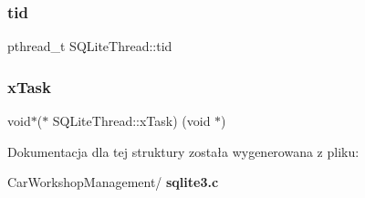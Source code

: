 \subsubsection{tid}
{\footnotesize\ttfamily pthread\+\_\+t S\+Q\+Lite\+Thread\+::tid}

\mbox{\label{struct_s_q_lite_thread_aadc8f1c225e769d42d981ae2e701d018}} 
\subsubsection{xTask}
{\footnotesize\ttfamily void$\ast$($\ast$ S\+Q\+Lite\+Thread\+::x\+Task) (void $\ast$)}



Dokumentacja dla tej struktury została wygenerowana z pliku\+:\begin{DoxyCompactItemize}
\item 
Car\+Workshop\+Management/\textbf{ sqlite3.\+c}\end{DoxyCompactItemize}
